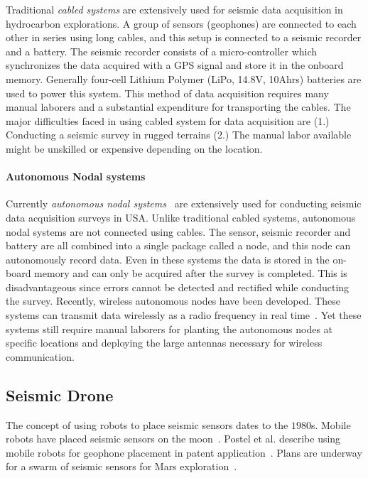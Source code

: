  Traditional \emph{cabled systems} are extensively used for seismic data acquisition in hydrocarbon explorations. A group of sensors (geophones) are connected to each other in series using long cables, and this setup is connected to a seismic recorder and a battery. The seismic recorder consists of a micro-controller which synchronizes the data acquired with a GPS signal and store it in the onboard memory. Generally four-cell Lithium Polymer (LiPo, 14.8V, 10Ahrs) batteries are used to power this system. This method of data acquisition requires many manual laborers and a substantial expenditure for transporting the cables. The major difficulties faced in using cabled system for data acquisition are (1.) Conducting a seismic survey in rugged terrains (2.) The manual labor available might be unskilled or expensive depending on the location.  
 
 \paragraph{Autonomous Nodal systems}

 Currently \emph{autonomous nodal systems}~\cite{wood1998distributed} are extensively used for conducting seismic data acquisition surveys in USA. Unlike traditional cabled systems, autonomous nodal systems are not connected using cables. The sensor, seismic recorder and battery are all combined into a single package called a node, and this node can autonomously record data. Even in these systems the data is stored in the on-board memory and can only be acquired after the survey is completed. This is disadvantageous since errors cannot be detected and rectified while conducting the survey. Recently, wireless autonomous nodes have been developed. These systems can transmit data wirelessly as a radio frequency in real time~\cite{jiang2015geophysical}. Yet these systems still require manual laborers for planting the autonomous nodes at specific locations and deploying the large antennas necessary for wireless communication.
 
\subsection{Seismic Drone}  

The concept of using robots to place seismic sensors dates to the $1980$s. Mobile robots have placed seismic sensors on the moon~\cite{LSisMSE81}. Postel et al. describe using mobile robots for geophone placement in patent application~\cite{DSSMaA14}. Plans are underway for a swarm of seismic sensors for Mars exploration~\cite{MAPL2006}.

